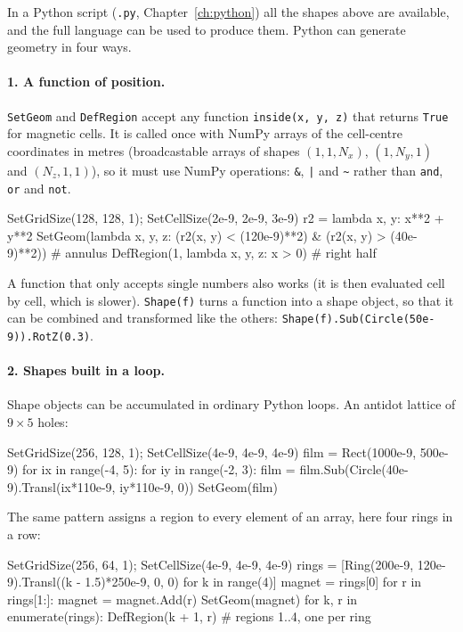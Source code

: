 \documentclass[11pt,a4paper,oneside]{book}
\newcommand{\code}[1]{\texttt{#1}}
\renewcommand{\_}{\textunderscore\allowbreak}
\begin{document}
In a Python script (\code{.py}, Chapter~\ref{ch:python}) all the shapes above are available, and the full language
can be used to produce them. Python can generate geometry in four ways.

\paragraph{1. A function of position.} \code{SetGeom} and \code{DefRegion} accept any function
\code{inside(x, y, z)} that returns \code{True} for magnetic cells. It is called once with NumPy arrays of the
cell-centre coordinates in metres (broadcastable arrays of shapes $(1,1,N_x)$, $(1,N_y,1)$ and $(N_z,1,1)$), so
it must use NumPy operations: \code{\&}, \code{|} and \code{\textasciitilde} rather than \code{and}, \code{or} and
\code{not}.
\begin{pycode}
SetGridSize(128, 128, 1); SetCellSize(2e-9, 2e-9, 3e-9)
r2 = lambda x, y: x**2 + y**2
SetGeom(lambda x, y, z: (r2(x, y) < (120e-9)**2) & (r2(x, y) > (40e-9)**2))   # annulus
DefRegion(1, lambda x, y, z: x > 0)                                          # right half
\end{pycode}
A function that only accepts single numbers also works (it is then evaluated cell by cell, which is slower).
\code{Shape(f)} turns a function into a shape object, so that it can be combined and transformed like the others:
\code{Shape(f).Sub(Circle(50e-9)).RotZ(0.3)}.

\paragraph{2. Shapes built in a loop.} Shape objects can be accumulated in ordinary Python loops. An antidot
lattice of $9\times5$ holes:
\begin{pycode}
SetGridSize(256, 128, 1); SetCellSize(4e-9, 4e-9, 4e-9)
film = Rect(1000e-9, 500e-9)
for ix in range(-4, 5):
    for iy in range(-2, 3):
        film = film.Sub(Circle(40e-9).Transl(ix*110e-9, iy*110e-9, 0))
SetGeom(film)
\end{pycode}
The same pattern assigns a region to every element of an array, here four rings in a row:
\begin{pycode}
SetGridSize(256, 64, 1); SetCellSize(4e-9, 4e-9, 4e-9)
rings = [Ring(200e-9, 120e-9).Transl((k - 1.5)*250e-9, 0, 0) for k in range(4)]
magnet = rings[0]
for r in rings[1:]:
    magnet = magnet.Add(r)
SetGeom(magnet)
for k, r in enumerate(rings):
    DefRegion(k + 1, r)          # regions 1..4, one per ring
\end{pycode}
\end{document}
